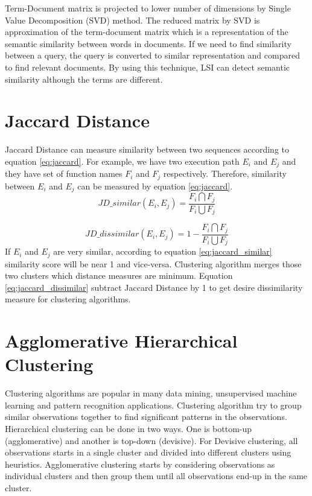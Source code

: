 Term-Document matrix is projected to lower number of dimensions by Single Value Decomposition (SVD) method. The reduced matrix by SVD is approximation of the term-document matrix which is a representation of the semantic similarity between words in documents. If we need to find similarity between a query, the query is converted to similar representation and compared to find relevant documents. By using this technique, LSI can detect semantic similarity although the terms are different.   


\section{Jaccard Distance}
Jaccard Distance can measure similarity between two sequences according to equation \ref{eq:jaccard}. For example, we have two execution path $E_i$ and $E_j$ and they have set of function names $F_i$ and $F_j$ respectively. Therefore, similarity between $E_i$ and $E_j$ can be measured by equation \ref{eq:jaccard}. 
\begin{equation}
\label{eq:jaccard_similar}
    JD\_similar(E_i, E_j) =  \frac{F_i \bigcap F_j}{F_i \bigcup F_j}
\end{equation}

\begin{equation}
\label{eq:jaccard_dissimilar}
    JD\_dissimilar(E_i, E_j) =  1 - \frac{F_i \bigcap F_j}{F_i \bigcup F_j}
\end{equation}
If $E_i$ and $E_j$ are very similar, according to equation \ref{eq:jaccard_similar} similarity score will be near 1 and vice-versa. Clustering algorithm merges those two clusters which distance measures are minimum. Equation \ref{eq:jaccard_dissimilar} subtract Jaccard Distance by 1 to get desire dissimilarity measure for clustering algorithms.

\section{Agglomerative Hierarchical Clustering}
Clustering algorithms are popular in many data mining, unsupervised machine learning and pattern recognition applications. Clustering algorithm try to group similar observations together to find significant patterns in the observations. Hierarchical clustering can be done in two ways. One is bottom-up (agglomerative) and another is top-down (devisive). For Devisive clustering, all observations starts in a single cluster and divided into different clusters using heuristics. Agglomerative clustering starts by considering observations as individual clusters and then group them until all observations end-up in the same cluster.

